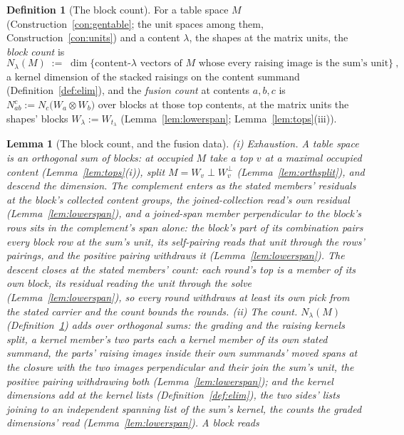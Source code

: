 \documentclass[11pt]{article}
\newtheorem{lemma}{Lemma}
\theoremstyle{definition}
\newtheorem{definition}{Definition}
\begin{document}
\begin{definition}[The block count]\label{def:blockcount}
For a table space $M$ (Construction~\ref{con:gentable}; the unit
spaces among them, Construction~\ref{con:units}) and a content
$\lambda$, the shapes at the matrix units, the \emph{block count}
is
\[
N_\lambda(M)\;:=\;\dim\{\text{content-$\lambda$ vectors of $M$ whose
every raising image is the sum's unit}\}\ ,
\]
a kernel dimension of the stacked raisings on the content summand
(Definition~\ref{def:elim}), and the \emph{fusion count} at contents
$a,b,c$ is $N^c_{ab}:=N_c\big(W_a\otimes W_b\big)$ over blocks at
those top contents, at the matrix units the shapes' blocks
$W_\lambda:=W_{t_\lambda}$ (Lemma~\ref{lem:lowerspan};
Lemma~\ref{lem:tops}(iii)).
\end{definition}

\begin{lemma}[The block count, and the fusion data]\label{lem:blockcount}
\emph{(i) Exhaustion.} A table space is an orthogonal sum of blocks: at occupied $M$ take a top $v$ at a maximal occupied content
(Lemma~\ref{lem:tops}(i)), split $M=W_v\perp W_v^\perp$
(Lemma~\ref{lem:orthsplit}), and descend the dimension. The
complement enters as the stated members' residuals at the block's
collected content groups, the joined-collection read's own
residual (Lemma~\ref{lem:lowerspan}), and a joined-span member
perpendicular to the block's rows sits in the complement's span
alone: the block's part of its combination pairs every block row
at the sum's unit, its self-pairing reads that unit through the
rows' pairings, and the positive pairing withdraws it
(Lemma~\ref{lem:lowerspan}). The descent closes at the stated
members' count: each round's top is a member of its own block,
its residual reading the unit through the solve
(Lemma~\ref{lem:lowerspan}), so every round withdraws at least
its own pick from the stated carrier and the count bounds the
rounds.
\emph{(ii) The count.} $N_\lambda(M)$
(Definition~\ref{def:blockcount}) adds over orthogonal sums: the
grading and the raising kernels split, a kernel member's two
parts each a kernel member of its own stated summand, the parts'
raising images inside their own summands' moved spans at the
closure with the two images perpendicular and their join the
sum's unit, the positive pairing withdrawing both
(Lemma~\ref{lem:lowerspan}); and the kernel dimensions add at
the kernel lists (Definition~\ref{def:elim}), the two sides'
lists joining to an independent spanning list of the sum's
kernel, the counts the graded dimensions' read
(Lemma~\ref{lem:lowerspan}). A block reads

\end{lemma}
\end{document}
